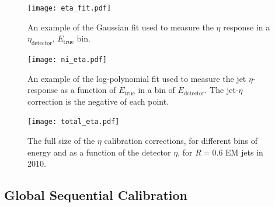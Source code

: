 
\begin{figure}
\centering
\texttt{[image: eta\_fit.pdf]}
\label{fig:jet-reconstruction:eta-fit}
\caption{An example of the Gaussian fit used to measure the $\eta$ response in a $\eta_\mathrm{detector}$, $E_\mathrm{true}$ bin.}
\end{figure}



\begin{figure}
\centering
\texttt{[image: ni\_eta.pdf]}
\label{fig:jet-reconstruction:ni-eta}
\caption{An example of the log-polynomial fit used to measure the jet $\eta$-response as a function of $E_\mathrm{true}$ in a bin of $E_\mathrm{detector}$. The jet-$\eta$ correction is the negative of each point.}
\end{figure}



\begin{figure}
\centering
\texttt{[image: total\_eta.pdf]}
\label{fig:jet-reconstruction:total-eta}
\caption{The full size of the $\eta$ calibration corrections, for different bins of energy and as a function of the detector $\eta$, for $R=0.6$ EM jets in 2010.}
\end{figure}




\subsection{Global Sequential Calibration}
\label{jet-reconstruction:calibration:gsc}

